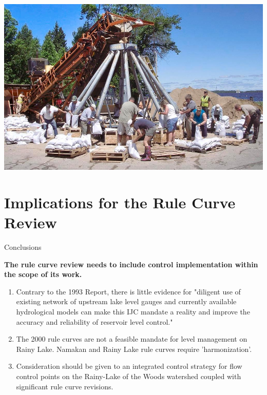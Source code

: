 \documentclass[compress,english]{beamer}
\begin{document}
{\usebackgroundtemplate%
	{\includegraphics[height=\paperheight]{myersFLOOD0618c10_0.jpg}}
\section{Implications for the Rule Curve Review}
}

\begin{frame}{Conclusions}

{\bf The rule curve review needs to include control implementation within the scope of its work.}

\begin{enumerate}

\item Contrary to the 1993 Report, there is little evidence for "diligent use of existing network of upstream lake level gauges and currently available hydrological models can make this IJC mandate a reality and improve the accuracy and reliability of reservoir level control."

\item The 2000 rule curves are not a feasible mandate for level management on Rainy Lake. Namakan and Rainy Lake rule curves require 'harmonization'.

\item  Consideration should be given to an integrated control strategy for flow control points on the Rainy-Lake of the Woods watershed coupled with significant rule curve revisions.
	
\end{enumerate}

\end{frame}
\end{document}
